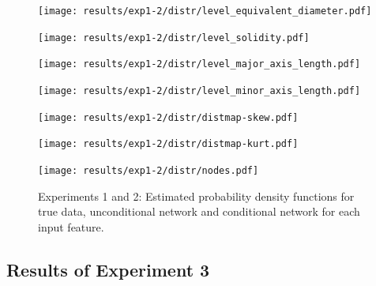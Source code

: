 \begin{figure}[h!] 
	\begin{minipage}[b]{0.45\linewidth}
		\centering
		\texttt{[image: results/exp1-2/distr/level\_equivalent\_diameter.pdf]} 
		\label{fig:results-input-distr-level_equivalent_diameter}
	\end{minipage}
	\hfil
	\begin{minipage}[b]{0.45\linewidth}
		\centering
		\texttt{[image: results/exp1-2/distr/level\_solidity.pdf]} 
		\label{fig:results-input-distr-level_solidity}
	\end{minipage}
	
	\begin{minipage}[b]{0.45\linewidth}
		\centering
		\texttt{[image: results/exp1-2/distr/level\_major\_axis\_length.pdf]} 
		\label{fig:results-input-distr-level_major_axis_length}
	\end{minipage}
	\hfil
	\begin{minipage}[b]{0.45\linewidth}
		\centering
		\texttt{[image: results/exp1-2/distr/level\_minor\_axis\_length.pdf]} 
		\label{fig:results-input-distr-level_minor_axis_length}
	\end{minipage}
	
	\begin{minipage}[b]{0.45\linewidth}
		\centering
		\texttt{[image: results/exp1-2/distr/distmap-skew.pdf]} 
		\label{fig:results-input-distr-distmap-skew}
	\end{minipage}
	\hfil
	\begin{minipage}[b]{0.45\linewidth}
		\centering
		\texttt{[image: results/exp1-2/distr/distmap-kurt.pdf]} 
		\label{fig:results-input-distr-distmap-kurt}
	\end{minipage}
	
	\centering
	\begin{minipage}[b]{0.45\linewidth}
		\centering
		\texttt{[image: results/exp1-2/distr/nodes.pdf]} 
		\label{fig:results-input-distr-nodes}
	\end{minipage}
	
	\caption[Graphical results for experiments 1 and 2: Probability Densities]{Experiments 1 and 2: Estimated probability density functions for true data, unconditional network and conditional network for each input feature.}
	\label{fig:results-input-distr-features}
	
\end{figure}

\FloatBarrier
\subsection{Results of Experiment 3}
